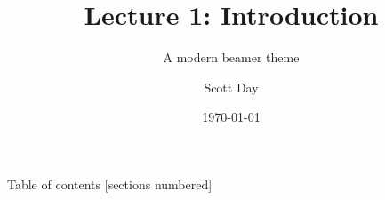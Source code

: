 \documentclass[10pt]{beamer}
\title{Lecture 1: Introduction}
\subtitle{A modern beamer theme}
\date{\today}
\author{Scott Day}
\institute{Curtin University}
\begin{document}


\maketitle

\begin{frame}{Table of contents}
  [sections numbered]
  \tableofcontents[hideallsubsections]
\end{frame}







\end{document}
